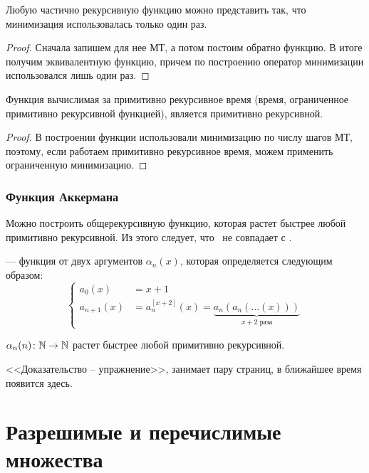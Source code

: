 \begin{cor}
    Любую частично рекурсивную функцию можно представить так, что минимизация использовалась только один раз.
\end{cor}
\begin{proof}
    Сначала запишем для нее МТ, а потом постоим обратно функцию. В итоге получим эквивалентную функцию, причем по построению оператор минимизации использовался лишь один раз.
\end{proof}
\begin{cor}
	Функция вычислимая за примитивно рекурсивное время (время, ограниченное примитивно рекурсивной функцией), является примитивно рекурсивной.
\end{cor}
\begin{proof}
    В построении функции использовали минимизацию по числу шагов МТ,  поэтому, если работаем примитивно рекурсивное время, можем применить ограниченную минимизацию. 
\end{proof}

\subsection{Функция Аккермана}
Можно построить общерекурсивную функцию, которая растет быстрее любой примитивно рекурсивной. Из этого следует, что \prf\ не совпадает с \orf.
\begin{defn}
	  --- функция от двух аргументов $ \alpha _n(x)$, которая определяется следующим образом:
	\[
		\begin{cases}
			a_0(x) &= x+1 \\ 
			a_{n+1}(x) &= a_{n}^{[x+2]}(x) = \underbrace{a_{n} (a_n( \ldots (x)))}_{x+2 \text{ раза}}  
		\end{cases}
	\] 
\end{defn}
\begin{thm}
	$ \alpha _{n}(n) \colon \mathbb{N} \to \mathbb{N}$  растет быстрее любой примитивно рекурсивной.
\end{thm}
\begin{proof*}
    <<Доказательство -- упражнение>>, занимает пару страниц, в ближайшее время появится здесь.
\end{proof*}

\chapter{Разрешимые и перечислимые множества}
